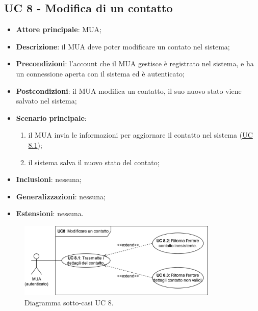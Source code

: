 \subsection{UC 8 - Modifica di un contatto} \label{sec:UC8}
    \begin{itemize}
        \item \textbf{Attore principale}: MUA;
        \item \textbf{Descrizione}: il MUA deve poter modificare un contato nel sistema;
        \item \textbf{Precondizioni}: l’account che il MUA gestisce è registrato nel sistema, e ha un connessione aperta con il sistema ed è autenticato;
        \item \textbf{Postcondizioni}: il MUA modifica un contatto, il suo nuovo stato viene salvato nel sistema;
        \item \textbf{Scenario principale}:
            \begin{enumerate}
                \item il MUA invia le informazioni per aggiornare il contatto nel sistema (\hyperref[sec:UC8.1]{UC 8.1});
                \item il sistema salva il nuovo stato del contato;
            \end{enumerate}
        \item \textbf{Inclusioni}: nessuna;
        \item \textbf{Generalizzazioni}: nessuna;
        \item \textbf{Estensioni}: nessuna.
    \end{itemize}

\begin{figure}[h]
    \includegraphics[width=0.85\textwidth]{sections/uc_imgs/UC08.X.png}
    \centering
    \caption{Diagramma sotto-casi UC 8.}
\end{figure}


